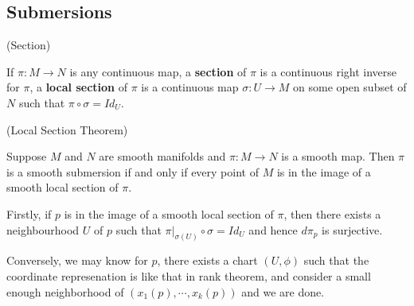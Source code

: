 \subsection{Submersions}

\begin{definition}(Section)\par
    If $\pi:M\to N$ is any continuous map, a \textbf{section} of $\pi$ is a continuous right inverse for $\pi$, a \textbf{local section} of $\pi$ is a continuous map $\sigma:U\to M$ on some open subset of $N$ such that $\pi\circ \sigma = Id_U$.
\end{definition}

\begin{theorem}(Local Section Theorem)\par
    Suppose $M$ and $N$ are smooth manifolds and $\pi:M\to N$ is a smooth map. Then $\pi$ is a smooth submersion if and only if every point of $M$ is in the image of a smooth local section of $\pi$.
\end{theorem}
\Pf\par
    Firstly, if $p$ is in the image of a smooth local section of $\pi$, then there exists a neighbourhood $U$ of $p$ such that $\pi|_{\sigma(U)} \circ \sigma = Id_U$ and hence $d\pi_p$ is surjective.\par
    Conversely, we may know for $p$, there exists a chart $(U,\phi)$ such that the coordinate represenation is like that in rank theorem, and consider a small enough neighborhood of $(x_1(p),\cdots,x_k(p))$ and we are done.



